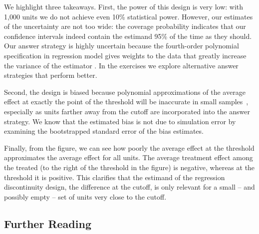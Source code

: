\documentclass[11pt]{article}\usepackage[]{graphicx}\usepackage[]{color}
\begin{document}
We highlight three takeaways. First, the power of this design is very low: with 1,000 units we do not achieve even 10\% statistical power. However, our estimates of the uncertainty are not too wide: the coverage probability indicates that our confidence intervals indeed contain the estimand 95\% of the time as they should. Our answer strategy is highly uncertain because the fourth-order polynomial specification in regression model gives weights to the data that greatly increase the variance of the estimator \citep{gelman2017high}. In the exercises we explore alternative answer strategies that perform better.
  
Second, the design is biased because polynomial approximations of the average effect at exactly the point of the threshold will be inaccurate in small samples~\citep{sekhontitiunik2017}, especially as units farther away from the cutoff are incorporated into the answer strategy. We know that the estimated bias is not due to simulation error by examining the bootstrapped standard error of the bias estimates.

Finally, from the figure, we can see how poorly the average effect at the threshold approximates the average effect for all units. The average treatment effect among the treated (to the right of the threshold in the figure) is negative, whereas at the threshold it is positive. This clarifies that the estimand of the regression discontinuity design, the difference at the cutoff, is only relevant for a small -- and possibly empty -- set of units very close to the cutoff. \smallskip

\subsection*{Further Reading} 
\end{document}
